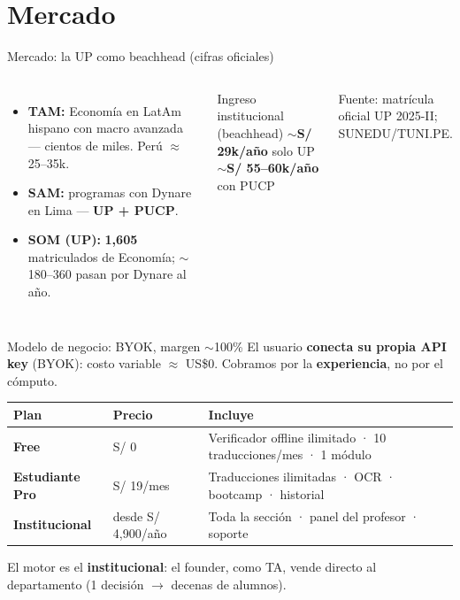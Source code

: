 \section{Mercado}

\begin{frame}{Mercado: la UP como beachhead (cifras oficiales)}
  \begin{columns}[T]
      \begin{itemize}\small
        \item \textbf{TAM:} Economía en LatAm hispano con macro avanzada
              — cientos de miles. Perú $\approx$ 25--35k.
        \item \textbf{SAM:} programas con Dynare en Lima — \textbf{UP + PUCP}.
        \item \textbf{SOM (UP):} \textbf{1{,}605} matriculados de Economía;
              $\sim$180--360 pasan por Dynare al año.
      \end{itemize}
      \begin{exampleblock}{Ingreso institucional (beachhead)}
        $\sim$\textbf{S/ 29k/año} solo UP \\
        $\sim$\textbf{S/ 55--60k/año} con PUCP
      \end{exampleblock}
      {\scriptsize\color{UWGrayL3} Fuente: matrícula oficial UP 2025-II; SUNEDU/TUNI.PE.}
  \end{columns}
\end{frame}

\begin{frame}{Modelo de negocio: BYOK, margen $\sim$100\%}
  El usuario \textbf{conecta su propia API key} (BYOK): costo variable $\approx$ US\$0.
  Cobramos por la \textbf{experiencia}, no por el cómputo.
  \vspace{6pt}
  \begin{center}\footnotesize
  \renewcommand{\arraystretch}{1.35}
  \begin{tabular}{@{}>{\bfseries}l l p{}@{}}
    \toprule
    Plan & Precio & Incluye \\
    \midrule
    Free & S/ 0 & Verificador offline ilimitado · 10 traducciones/mes · 1 módulo \\
    Estudiante Pro & S/ 19/mes & Traducciones ilimitadas · OCR · bootcamp · historial \\
    Institucional & desde S/ 4{,}900/año & Toda la sección · panel del profesor · soporte \\
    \bottomrule
  \end{tabular}
  \end{center}
  \vspace{2pt}
  {\footnotesize El motor es el \textbf{institucional}: el founder, como TA, vende
  directo al departamento (1 decisión $\rightarrow$ decenas de alumnos).}
\end{frame}

